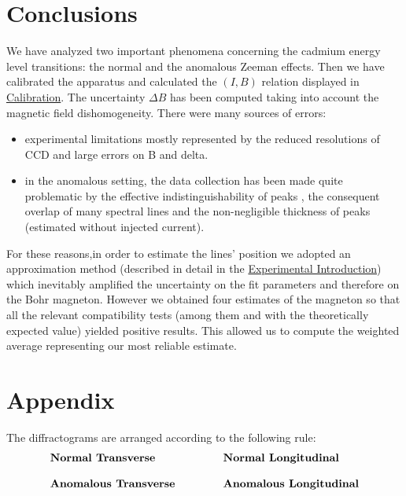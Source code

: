 \documentclass[a4paper,12pt,abstracton]{scrartcl}
\begin{document}
\section{Conclusions}
We have analyzed two important phenomena concerning the cadmium energy level transitions: the normal and the anomalous Zeeman effects.  Then we have calibrated the apparatus and calculated the $(I,B)$ relation displayed in \hyperref[sec: cal]{Calibration}. The uncertainty $\Delta B $ has been computed taking into account the magnetic field dishomogeneity. There were many sources of errors: 
\begin{itemize}
    \item experimental limitations mostly represented by the reduced resolutions of CCD and large errors on B and delta.
    \item in the anomalous setting, the data collection has been made quite problematic by the effective indistinguishability of peaks , the consequent overlap of many spectral lines and the non-negligible thickness of peaks (estimated without injected current). 
\end{itemize}
For these reasons,in order to estimate the lines' position we adopted an approximation method (described in detail in the \hyperref[sec: ExpIntro]{Experimental Introduction}) which inevitably amplified the uncertainty on the fit parameters and therefore on the Bohr magneton. However we obtained four estimates of the magneton so that all the relevant compatibility tests (among them and with the theoretically expected value) yielded positive results. This allowed us to compute the weighted average representing our most reliable estimate.
\clearpage
\section{Appendix}\label{sec: appendix}
The diffractograms are arranged according to the following rule: 
$$
\begin{tabular}{l l}
\textbf{Normal Transverse} &\hspace{1cm} \textbf{Normal Longitudinal} \\ \\ 
\textbf{Anomalous Transverse}  &\hspace{1cm} \textbf{Anomalous Longitudinal} 
\end{tabular}
$$
\end{document}
